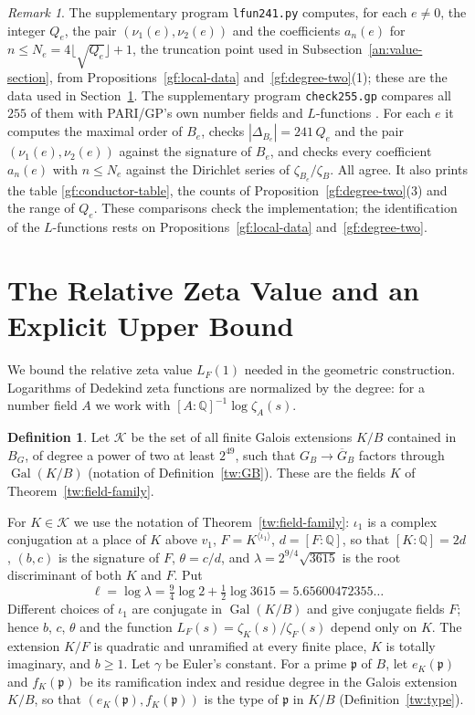 \documentclass[11pt]{amsart}
\numberwithin{equation}{section}
\theoremstyle{definition}
\newtheorem{definition}[equation]{Definition}
\theoremstyle{remark}
\newtheorem{remark}[equation]{Remark}
\DeclareMathOperator{\Gal}{Gal}
\newcommand{\Q}{\mathbb Q}
\begin{document}
\begin{remark}\label{gf:checks}
The supplementary program \texttt{lfun241.py} computes, for each $e\ne0$,
the integer $Q_e$, the pair $(\nu_1(e),\nu_2(e))$ and the coefficients
$a_n(e)$ for $n\le N_e=4\lfloor\sqrt{Q_e}\rfloor+1$, the truncation point
used in Subsection~\ref{an:value-section}, from
Propositions~\ref{gf:local-data} and~\ref{gf:degree-two}(1); these are the
data used in Section~\ref{an:section}. The supplementary program
\texttt{check255.gp} compares all $255$ of them with PARI/GP's own number
fields and $L$-functions \cite{PARI}. For each $e$ it computes the maximal
order of $B_e$, checks $|\Delta_{B_e}|=241\,Q_e$ and the pair
$(\nu_1(e),\nu_2(e))$ against the signature of $B_e$, and checks every
coefficient $a_n(e)$ with $n\le N_e$
against the Dirichlet series of $\zeta_{B_e}/\zeta_B$. All agree. It also
prints the table \eqref{gf:conductor-table}, the counts of
Proposition~\ref{gf:degree-two}(3) and the range of $Q_e$. These comparisons
check the implementation; the identification of the $L$-functions rests on
Propositions~\ref{gf:local-data} and~\ref{gf:degree-two}.
\end{remark}
\section{The Relative Zeta Value and an Explicit Upper Bound}\label{an:section}

We bound the relative zeta value $L_F(1)$ needed in the geometric
construction. Logarithms of Dedekind zeta functions are normalized by the
degree: for a number field $A$ we work with $[A:\Q]^{-1}\log\zeta_A(s)$.

\begin{definition}\label{an:family}
Let $\mathcal K$ be the set of all finite Galois extensions $K/B$ contained
in $B_G$, of degree a power of two at least $2^{49}$, such that
$G_B\to\overline G_B$ factors through $\Gal(K/B)$ (notation of
Definition~\ref{tw:GB}). These are the fields $K$ of
Theorem~\ref{tw:field-family}.
\end{definition}

For $K\in\mathcal K$ we use the notation of
Theorem~\ref{tw:field-family}: $\iota_1$ is a complex conjugation at a place of $K$ above
$v_1$, $F=K^{\langle\iota_1\rangle}$, $d=[F:\Q]$, so that $[K:\Q]=2d$, $(b,c)$
is the signature of $F$, $\theta=c/d$, and $\lambda=2^{9/4}\sqrt{3615}$ is the
root discriminant of both $K$ and $F$. Put
\[
 \ell=\log\lambda=\tfrac94\log2+\tfrac12\log3615=5.65600472355\ldots
\]
Different choices of $\iota_1$ are conjugate in $\Gal(K/B)$ and give
conjugate fields $F$; hence $b$, $c$, $\theta$ and the function
$L_F(s)=\zeta_K(s)/\zeta_F(s)$ depend only on $K$. The extension $K/F$ is
quadratic and unramified at every finite place, $K$ is totally imaginary,
and $b\ge1$. Let $\gamma$ be Euler's constant. For a
prime $\mathfrak p$ of $B$, let $e_K(\mathfrak p)$ and $f_K(\mathfrak p)$ be
its ramification index and residue degree in the Galois extension $K/B$, so
that $(e_K(\mathfrak p),f_K(\mathfrak p))$ is the type of $\mathfrak p$ in
$K/B$ (Definition~\ref{tw:type}).
\end{document}
